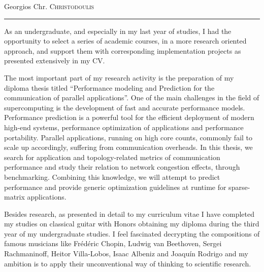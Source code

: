 \documentclass[a4paper,12pt]{article}
\begin{document}
\pagestyle{plain} %



\par{\centering
		{\Huge Georgios Chr. \textsc{Christodoulis}
	}\bigskip\par}
\hrule
\par{As an undergraduate, and especially in my last year of studies, I had the opportunity to select a series of academic courses, in a more research oriented approach, and support them with corresponding implementation projects as presented extensively in my CV.}
\par{The most important part of my research activity is the preparation of my diploma thesis titled “Performance modeling and Prediction for the communication of parallel applications”. One of the main challenges in the field of supercomputing is the development of fast and accurate performance models. Performance prediction is a powerful tool for the efficient deployment of modern high-end systems, performance optimization of applications and performance portability. Parallel applications, running on high core counts, commonly fail to scale up accordingly, suffering from communication overheads. In this thesis, we search for application and topology-related metrics of communication performance and study their relation to network congestion effects, through benchmarking. Combining this knowledge, we will attempt to predict performance and provide generic optimization guidelines at runtime for sparse-matrix applications.}
\par{Besides research, as presented in detail to my curriculum vitae I have completed my studies on classical guitar with Honors obtaining my diploma during the third year of my undergraduate studies. I feel fascinated decrypting the compositions of famous musicians like Frédéric Chopin, Ludwig van Beethoven, Sergei Rachmaninoff, Heitor Villa-Lobos, Isaac Albeniz and Joaquín Rodrigo and my ambition is to apply their unconventional way of thinking to scientific research.}

\par{}
\par{}
\end{document}
